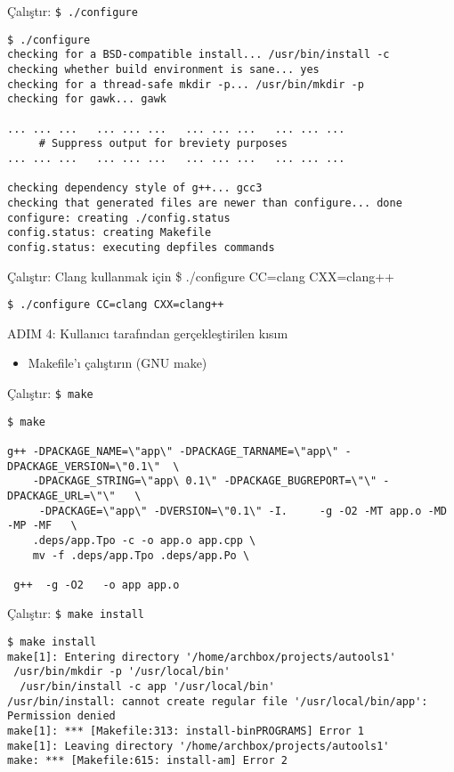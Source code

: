 \documentclass[
]{book}
\providecommand{\tightlist}{%
  \setlength{\itemsep}{0pt}\setlength{\parskip}{0pt}}
\begin{document}
Çalıştır: \texttt{\$\ ./configure}

\begin{verbatim}
$ ./configure 
checking for a BSD-compatible install... /usr/bin/install -c
checking whether build environment is sane... yes
checking for a thread-safe mkdir -p... /usr/bin/mkdir -p
checking for gawk... gawk

... ... ...   ... ... ...   ... ... ...   ... ... ... 
     # Suppress output for breviety purposes 
... ... ...   ... ... ...   ... ... ...   ... ... ... 

checking dependency style of g++... gcc3
checking that generated files are newer than configure... done
configure: creating ./config.status
config.status: creating Makefile
config.status: executing depfiles commands
\end{verbatim}

Çalıştır: Clang kullanmak için \$ ./configure CC=clang CXX=clang++

\texttt{\$\ ./configure\ CC=clang\ CXX=clang++}

ADIM 4: Kullanıcı tarafından gerçekleştirilen kısım

\begin{itemize}
\tightlist
\item
  Makefile'ı çalıştırın (GNU make)
\end{itemize}

Çalıştır: \texttt{\$\ make}

\begin{verbatim}
$ make

g++ -DPACKAGE_NAME=\"app\" -DPACKAGE_TARNAME=\"app\" -DPACKAGE_VERSION=\"0.1\"  \
    -DPACKAGE_STRING=\"app\ 0.1\" -DPACKAGE_BUGREPORT=\"\" -DPACKAGE_URL=\"\"   \
     -DPACKAGE=\"app\" -DVERSION=\"0.1\" -I.     -g -O2 -MT app.o -MD -MP -MF   \
    .deps/app.Tpo -c -o app.o app.cpp \
    mv -f .deps/app.Tpo .deps/app.Po \

 g++  -g -O2   -o app app.o  
\end{verbatim}

Çalıştır: \texttt{\$\ make\ install}

\begin{verbatim}
$ make install
make[1]: Entering directory '/home/archbox/projects/autools1'
 /usr/bin/mkdir -p '/usr/local/bin'
  /usr/bin/install -c app '/usr/local/bin'
/usr/bin/install: cannot create regular file '/usr/local/bin/app': Permission denied
make[1]: *** [Makefile:313: install-binPROGRAMS] Error 1
make[1]: Leaving directory '/home/archbox/projects/autools1'
make: *** [Makefile:615: install-am] Error 2
\end{verbatim}
\end{document}
